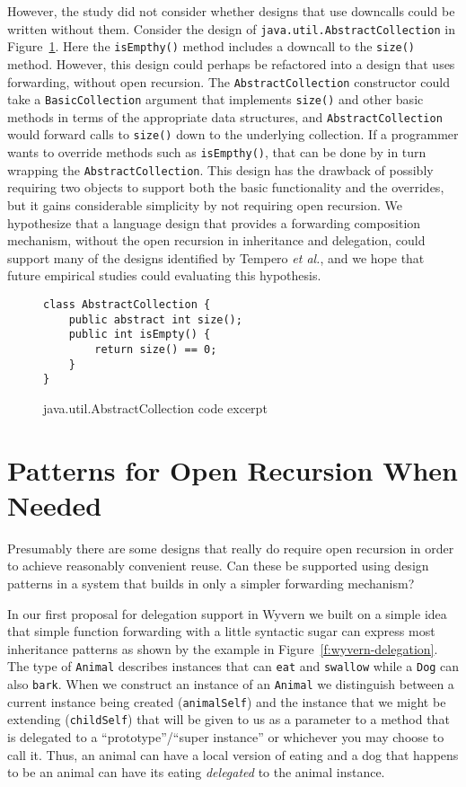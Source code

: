 \documentclass[preprint]{sigplanconf}
\begin{document}
However, the study did not consider whether designs that use
downcalls could be written without them.  Consider the design
of \texttt{java.util.AbstractCollection} in
Figure~\ref{f:abstract-collection}.  Here the \texttt{isEmpthy()}
method includes a downcall to the \texttt{size()} method.
However, this design could perhaps be refactored into a design
that uses forwarding, without open recursion.  The
\texttt{AbstractCollection} constructor could take a
\texttt{BasicCollection} argument that implements \texttt{size()}
and other basic methods in terms of the appropriate data
structures, and \texttt{AbstractCollection} would forward calls
to \texttt{size()} down to the underlying collection.  If a
programmer wants to override methods such as \texttt{isEmpthy()},
that can be done by in turn wrapping the \texttt{AbstractCollection}.
This design has the drawback of possibly requiring two objects to
support both the basic functionality and the overrides, but it gains
considerable simplicity by not requiring open recursion.  We
hypothesize that a language design that provides a forwarding
composition mechanism, without the open recursion in inheritance
and delegation, could support many of the designs identified by
Tempero \textit{et al.}, and we hope that future empirical studies
could evaluating this hypothesis.

\begin{figure}
\begin{lstlisting}
class AbstractCollection {
    public abstract int size();
	public int isEmpty() {
	    return size() == 0;
	}
}
\end{lstlisting}
\caption{java.util.AbstractCollection code excerpt}
\label{f:abstract-collection}
\end{figure}


\section{Patterns for Open Recursion When Needed}

Presumably there are some designs that really do require open recursion
in order to achieve reasonably convenient reuse.  Can these be supported
using design patterns in a system that builds in only a simpler
forwarding mechanism?




In our first proposal for delegation support in Wyvern we built on a simple idea that simple function forwarding with a little syntactic sugar can express most inheritance patterns as shown by the example in Figure~\ref{f:wyvern-delegation}. The type of \texttt{Animal} describes instances that can \texttt{eat} and \texttt{swallow} while a \texttt{Dog} can also \texttt{bark}. When we construct an instance of an \texttt{Animal} we distinguish between a current instance being created (\texttt{animalSelf}) and the instance that we might be extending (\texttt{childSelf}) that will be given to us as a parameter to a method that is delegated to a ``prototype''/``super instance'' or whichever you may choose to call it. Thus, an animal can have a local version of eating and a dog that happens to be an animal can have its eating \textit{delegated} to the animal instance.
\end{document}
